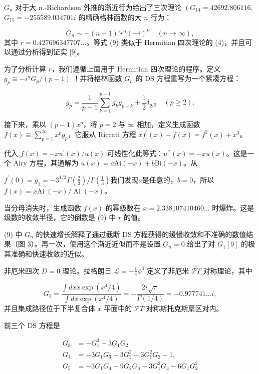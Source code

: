 \documentclass[UTF8]{ctexart}
\begin{document}
\( G_{n} \) 对于大 n.-Richardson 外推的渐近行为给出了三次理论 \( \left(G_{14}=42692.806116\right. \), \( G_{15}=-255589.034701 i \) 的精确格林函数的大 \( n \) 行为：


\[
G_{n} \sim-(n-1) ! r^{n}(-i)^{n} \quad(n \rightarrow \infty),
\] 其中 \( r=0.427696347707 \ldots \)。等式 (9) 类似于 Hermitian 四次理论的 (4)，并且可以通过分析得到证实 [9]。



为了分析计算 \( r \)，我们遵循上面用于 Hermitian 四次理论的程序。定义 \( g_{p} \equiv-i^{n} G_{p} /(p-1) \) ！并将格林函数 \( G_{n} \) 的 DS 方程重写为一个紧凑方程：




\[g_{p}=\frac{1}{p-1} \sum_{k=1}^{p-1} g_{k} g_{p-k}+\frac{1}{2} \delta_{p, 3} \quad(p \geq 2) .
\]


接下来，乘以 \( (p-1) x^{p} \)，将 \( p=2 \) 与 \( \infty \) 相加，定义生成函数 \( f(x) \equiv \sum_{p=1}^{\infty} x^{p} g_{p} \)，它服从 Riccati 方程 \( x f^{\prime}(x)-f(x)=f^{2}(x)+x^{3} \)。


代入 \( f(x)=-x u^{\prime}(x) / u(x) \) 可线性化此等式：\( u^{\prime \prime}(x)=-x u(x) \)。这是一个 Airy 方程，其通解为 \( u(x)=a \mathrm{Ai}(-x)+b \mathrm{Bi}(-x) \)。从


\( f^{\prime}(0)=g_{1}=-3^{1 / 3} \Gamma\left(\frac{2}{3}\right) / \Gamma\left(\frac{1}{3}\right) \)我们发现\( a \)是任意的，\( b=0 \)，所以\( f(x)=x \mathrm{Ai}^{\prime}(-x) / \operatorname{Ai}(-x) \)。

当分母消失时，生成函数 \( f(x) \) 的幂级数在 \( x=2.338107410460 \ldots \) 时爆炸。这是级数的收敛半径，它的倒数是 (9) 中 \( r \) 的值。

(9) 中 \( G_{n} \) 的快速增长解释了通过截断 DS 方程获得的缓慢收敛和不准确的数值结果（图 3）。再一次，使用这个渐近近似而不是设置 \( G_{n}=0 \) 给出了对 \( G_{1}[9] \) 的极其准确和快速收敛的近似。



非厄米四次 \( D=0 \) 理论。拉格朗日 \( \mathcal{L}=-\frac{1}{4} \phi^{4} \) 定义了非厄米 \( \mathcal{P} T \) 对称理论，其中


\[
G_{1}=\frac{\int d x x \exp \left(x^{4} / 4\right)}{\int d x \exp \left(x^{4} / 4\right)}=-\frac{2 i \sqrt{\pi}}{\Gamma(1 / 4)}=-0.977741 \ldots i,
\] 并且集成路径位于下半复合体 \( x \) 平面中的 \( \mathcal{P} T \) 对称斯托克斯扇区对内。


前三个 DS 方程是




\[
\begin{aligned}
G_{3} & =-G_{1}^{3}-3 G_{1} G_{2} \\
G_{4} & =-3 G_{1} G_{3}-3 G_{2}^{2}-3 G_{1}^{2} G_{2}-1, \\
G_{5} & =-3 G_{1} G_{4}-9 G_{2} G_{3}-3 G_{1}^{2} G_{3}-6 G_{1} G_{2}^{2}
\end{aligned}
\]
\end{document}
